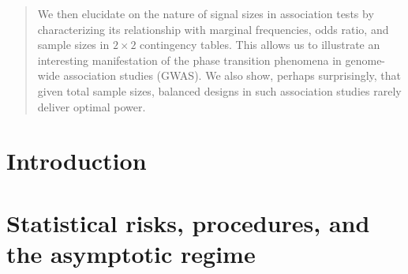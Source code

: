 \documentclass[aos, preprint]{imsart}
\numberwithin{equation}{section}
\theoremstyle{plain}
\theoremstyle{definition}
\theoremstyle{remark}
\begin{document}
\begin{frontmatter}
\begin{abstract}
We then elucidate on the nature of signal sizes in association tests by characterizing its relationship with marginal frequencies, odds ratio, and sample sizes in $2\times2$ contingency tables.
This allows us to illustrate an interesting manifestation of the phase transition phenomena in genome-wide association studies (GWAS).
We also show, perhaps surprisingly, that given total sample sizes, balanced designs in such association studies rarely deliver optimal power. 

\end{abstract}

\begin{keyword}[class=MSC]
\end{keyword}

\begin{keyword}
\end{keyword}
\tableofcontents
\end{frontmatter}

\section{Introduction}
\label{sec:intro}


\section{Statistical risks, procedures, and the asymptotic regime}
\label{sec:setup}

\end{document}
